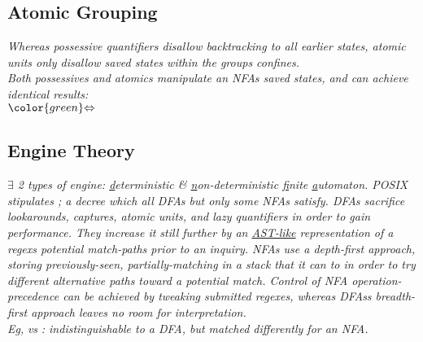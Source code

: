 

\subsection*{Atomic Grouping \quad {}}
\textit{Whereas possessive quantifiers disallow backtracking to all earlier states, atomic units only disallow saved states within the group\textquotesingle s confines.}\\[1mm]
\textit{Both possessives and atomics manipulate an NFA\textquotesingle s saved states, and can achieve identical results:}\\
 $\color{green}\large{\Leftrightarrow}$


\subsection*{Engine Theory}
\textit{$\exists$ 2 types of engine: \ul{d}eterministic \& \ul{n}on-deterministic \ul{f}inite \ul{a}utomaton. POSIX stipulates ; a decree which all DFAs but only some NFAs satisfy. DFAs sacrifice lookarounds, captures, atomic units, and lazy quantifiers in order to gain performance. They increase it still further by  an \href{https://en.wikipedia.org/wiki/Abstract\_syntax\_tree}{AST-like} representation of a regex\textquotesingle s potential match-paths prior to an inquiry. NFAs use a depth-first approach, storing previously-seen, partially-matching  in a stack that it can  to in order to try different alternative paths toward a potential match. Control of NFA operation-precedence can be achieved by tweaking submitted regexes, whereas DFAs\textquotesingle s breadth-first approach leaves no room for interpretation.}\\[1mm]
\textit{Eg, }\textit{ vs }\textit{: indistinguishable to a DFA, but matched differently for an NFA.}




